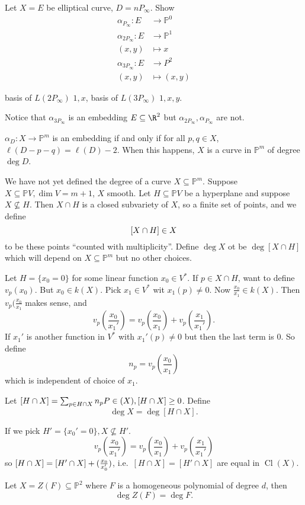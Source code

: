 \documentclass[a4paper]{article}
\DeclareMathOperator{\Cl}{Cl}
\renewcommand*{\P}{\mathbb{P}}
\let\div\relax
\begin{document}
\begin{ex}
  Let \(X = E\) be elliptical curve, \(D = nP_\infty\). Show
  \begin{align*}
    \alpha_{P_\infty}: E &\to \P^0 \\
    \alpha_{2P_\infty}: E &\to \P^1 \\
    (x, y) &\mapsto x \\
    \alpha_{3P_\infty}: E &\to P^2 \\
    (x, y) &\mapsto (x, y)
  \end{align*}

  basis of \(L(2P_\infty)\) \(1, x\), basis of \(L(3P_\infty)\) \(1, x, y\).
  
  Notice that \(\alpha_{3P_\infty}\)  is an embedding \(E \subseteq \R^2\) but \(\alpha_{2P_\infty}, \alpha_{P_\infty}\) are not.
\end{ex}

\begin{theorem}
  \(\alpha_D: X \to \P^m\) is an embedding if and only if for all \(p, q \in X\), \(\ell(D - p - q) = \ell(D) - 2\). When this happens, \(X\) is a curve in \(\P^m\) of degree \(\deg D\).
\end{theorem}

We have not yet defined the degree of a curve \(X \subseteq \P^m\). Suppose \(X \subseteq \P V, \dim V = m + 1\), \(X\) smooth. Let \(H \subseteq \P V\) be a hyperplane and suppose \(X \nsubseteq H\). Then \(X \cap H\) is a closed subvariety of \(X\), so a finite set of points, and we define
\[
  [X \cap H] \in \div X
\]
to be these points ``counted with multiplicity''. Define \(\deg X\) ot be \(\deg [X \cap H]\) which will depend on \(X \subseteq \P^m\) but no other choices.

\begin{eg}
  Let \(H = \{x_0 = 0\}\) for some linear function \(x_0 \in V^*\). If \(p \in X \cap H\), want to define \(v_p(x_0)\). But \(x_0 \in k(X)\). Pick \(x_1 \in V^*\) wit \(x_1(p) \neq 0\). Now \(\frac{x_0}{x_1} \in k(X)\). Then \(v_p(\frac{x_0}{x_1}\) makes sense, and
  \[
    v_p(\frac{x_0}{x_1'}) = v_p(\frac{x_0}{x_1}) + v_p(\frac{x_1}{x_1'}).
  \]
  If \(x_1'\) is another function in \(V^*\) with \(x_1'(p) \neq 0\) but then the last term is \(0\). So define
  \[
    n_p = v_p(\frac{x_0}{x_1})
  \]
  which is independent of choice of \(x_1\).
\end{eg}

\begin{definition}
  Let \([H \cap X] = \sum_{p \in H \cap X} n_pP \in \div (X), [H \cap X] \geq 0\). Define
  \[
    \deg X = \deg [H \cap X].
  \]
\end{definition}

If we pick \(H' = \{x_0' = 0\}, X \nsubseteq H'\).
\[
  v_p(\frac{x_0}{x_1'}) = v_p(\frac{x_0}{x_1}) + v_p(\frac{x_1}{x_1'})
\]
so \([H \cap X] = [H' \cap X] + \div (\frac{x_0}{x_0'})\), i.e.\ \([H \cap X] = [H' \cap X]\) are equal in \(\Cl(X)\).

\begin{lemma}
  Let \(X = Z(F) \subseteq \P^2\) where \(F\) is a homogeneous polynomial of degree \(d\), then
  \[
    \deg Z(F) = \deg F.
  \]
\end{lemma}
\fi


\printindex
\end{document}
